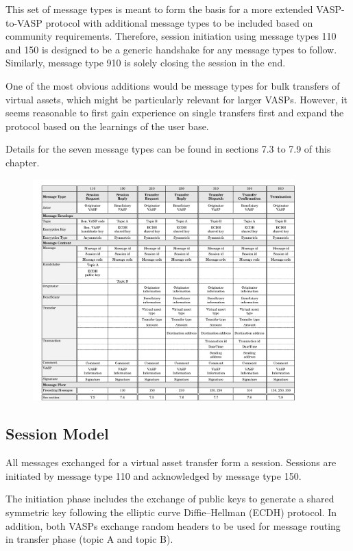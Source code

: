 \documentclass{article}
\begin{document}
This set of message types is meant to form the basis for a more extended VASP-to-VASP protocol with additional message types to be included based on community requirements. Therefore, session initiation using message types 110 and 150 is designed to be a generic handshake for any message types to follow. Similarly, message type 910 is solely closing the session in the end.

One of the most obvious additions would be message types for bulk transfers of virtual assets, which might be particularly relevant for larger VASPs. However, it seems reasonable to first gain experience on single transfers first and expand the protocol based on the learnings of the user base.

Details for the seven message types can be found in sections 7.3 to 7.9 of this chapter.
\begin{figure}[h]
    \centering
    \includegraphics[width=0.9\textwidth]{g18.pdf}
\end{figure}

\subsection{Session Model}
All messages exchanged for a virtual asset transfer form a session. Sessions are initiated by message type 110 and acknowledged by message type 150.

The initiation phase includes the exchange of public keys to generate a shared symmetric key following the elliptic curve Diffie–Hellman (ECDH) protocol. In addition, both VASPs exchange random headers to be used for message routing in transfer phase (topic A and topic B).
\end{document}
